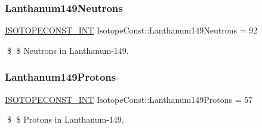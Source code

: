 \subsubsection{\texorpdfstring{Lanthanum149\+Neutrons}{Lanthanum149Neutrons}}
{\footnotesize\ttfamily \mbox{\hyperlink{group___isotope_const-_macros_ga5f18360b3e99483a35c32d789e62621c}{I\+S\+O\+T\+O\+P\+E\+C\+O\+N\+S\+T\+\_\+\+I\+NT}} Isotope\+Const\+::\+Lanthanum149\+Neutrons = 92}

\$ \$ Neutrons in Lanthanum-\/149. \mbox{\label{group___isotope_const-_lanthanum-_la149_ga3883722ddc0db3ec71e3cec780d4093b}} 
\subsubsection{\texorpdfstring{Lanthanum149\+Protons}{Lanthanum149Protons}}
{\footnotesize\ttfamily \mbox{\hyperlink{group___isotope_const-_macros_ga5f18360b3e99483a35c32d789e62621c}{I\+S\+O\+T\+O\+P\+E\+C\+O\+N\+S\+T\+\_\+\+I\+NT}} Isotope\+Const\+::\+Lanthanum149\+Protons = 57}

\$ \$ Protons in Lanthanum-\/149. 